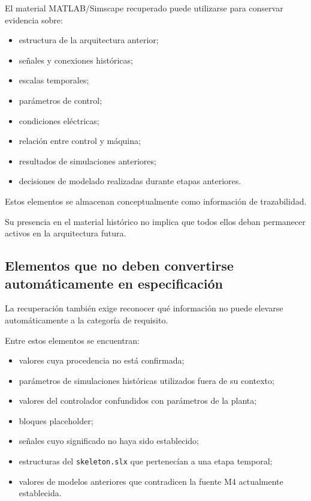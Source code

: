 El material MATLAB/Simscape recuperado puede utilizarse para conservar evidencia sobre:

\begin{itemize}
    \item estructura de la arquitectura anterior;
    \item señales y conexiones históricas;
    \item escalas temporales;
    \item parámetros de control;
    \item condiciones eléctricas;
    \item relación entre control y máquina;
    \item resultados de simulaciones anteriores;
    \item decisiones de modelado realizadas durante etapas anteriores.
\end{itemize}

Estos elementos se almacenan conceptualmente como información de trazabilidad.

Su presencia en el material histórico no implica que todos ellos deban permanecer activos en la arquitectura futura.

\subsection{Elementos que no deben convertirse automáticamente en especificación}

La recuperación también exige reconocer qué información no puede elevarse automáticamente a la categoría de requisito.

Entre estos elementos se encuentran:

\begin{itemize}
    \item valores cuya procedencia no está confirmada;
    \item parámetros de simulaciones históricas utilizados fuera de su contexto;
    \item valores del controlador confundidos con parámetros de la planta;
    \item bloques placeholder;
    \item señales cuyo significado no haya sido establecido;
    \item estructuras del \texttt{skeleton.slx} que pertenecían a una etapa temporal;
    \item valores de modelos anteriores que contradicen la fuente M4 actualmente establecida.
\end{itemize}

